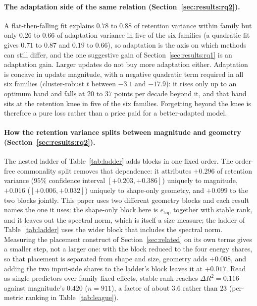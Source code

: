 \documentclass[11pt]{article}
\begin{document}
\paragraph{The adaptation side of the same relation
(Section~\ref{sec:results:rq2}).} A flat-then-falling fit
explains $0.78$ to $0.88$ of retention variance within family but only $0.26$
to $0.66$ of adaptation variance in five of the six families (a quadratic fit
gives $0.71$ to $0.87$ and $0.19$ to $0.66$), so adaptation is
the axis on which methods can still differ, and the one suggestive gain of
Section~\ref{sec:results:rq1} is an adaptation gain. Larger updates do not buy
more adaptation either. Adaptation is concave in update magnitude, with a
negative quadratic term required in all six families (cluster-robust $t$
between $-3.1$ and $-17.9$): it rises only up to an optimum band and falls at
$20$ to $37$ points per decade beyond it, and that band sits at the retention
knee in five of the six families. Forgetting beyond the knee is therefore a
pure loss rather than a price paid for a better-adapted model.

\paragraph{How the retention variance splits between magnitude and geometry
(Section~\ref{sec:results:rq2}).} The nested ladder of
Table~\ref{tab:ladder} adds blocks in one fixed order. The order-free
commonality split removes that dependence: it attributes $+0.296$ of
retention variance ($95\%$ confidence interval $[+0.203, +0.386]$) uniquely to
magnitude, $+0.016$ ($[+0.006, +0.032]$) uniquely to shape-only geometry, and
$+0.099$ to the two blocks jointly. This paper uses two different geometry
blocks and each result names the one it uses: the shape-only block here is
$e_{\mathrm{top}}$ together with stable rank, and it leaves out the spectral
norm, which is itself a size measure; the ladder of Table~\ref{tab:ladder} uses
the wider block that includes the spectral norm. Measuring the placement
construct of Section~\ref{sec:related} on its own terms gives a smaller
step, not a larger one: with the block reduced to the four energy shares, so
that placement is separated from shape and size, geometry adds $+0.008$, and
adding the two input-side shares to the ladder's block leaves it at
$+0.017$. Read as single predictors over family fixed effects, stable rank
reaches $\Delta R^2 = 0.116$ against magnitude's $0.420$ ($n = 911$), a
factor of about $3.6$ rather than $23$ (per-metric ranking in
Table~\ref{tab:league}).
\end{document}
